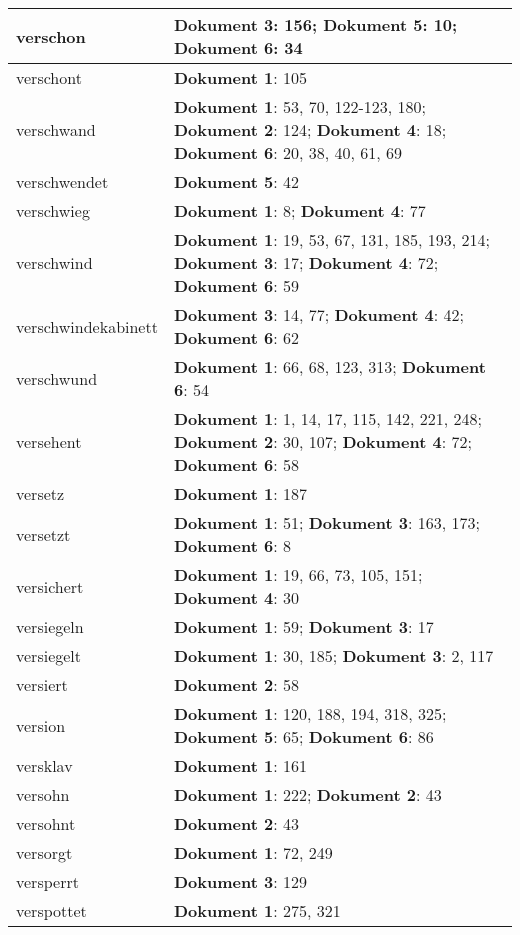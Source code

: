 \documentclass[a5paper]{article}
\begin{document}
\begin{longtable}[l]{|l|p{3in}|}
\hline
verschon & \textbf{Dokument 3}: 156; \textbf{Dokument 5}: 10; \textbf{Dokument 6}: 34 \\
\hline
verschont & \textbf{Dokument 1}: 105 \\
\hline
verschwand & \textbf{Dokument 1}: 53, 70, 122-123, 180; \textbf{Dokument 2}: 124; \textbf{Dokument 4}: 18; \textbf{Dokument 6}: 20, 38, 40, 61, 69 \\
\hline
verschwendet & \textbf{Dokument 5}: 42 \\
\hline
verschwieg & \textbf{Dokument 1}: 8; \textbf{Dokument 4}: 77 \\
\hline
verschwind & \textbf{Dokument 1}: 19, 53, 67, 131, 185, 193, 214; \textbf{Dokument 3}: 17; \textbf{Dokument 4}: 72; \textbf{Dokument 6}: 59 \\
\hline
verschwindekabinett & \textbf{Dokument 3}: 14, 77; \textbf{Dokument 4}: 42; \textbf{Dokument 6}: 62 \\
\hline
verschwund & \textbf{Dokument 1}: 66, 68, 123, 313; \textbf{Dokument 6}: 54 \\
\hline
versehent & \textbf{Dokument 1}: 1, 14, 17, 115, 142, 221, 248; \textbf{Dokument 2}: 30, 107; \textbf{Dokument 4}: 72; \textbf{Dokument 6}: 58 \\
\hline
versetz & \textbf{Dokument 1}: 187 \\
\hline
versetzt & \textbf{Dokument 1}: 51; \textbf{Dokument 3}: 163, 173; \textbf{Dokument 6}: 8 \\
\hline
versichert & \textbf{Dokument 1}: 19, 66, 73, 105, 151; \textbf{Dokument 4}: 30 \\
\hline
versiegeln & \textbf{Dokument 1}: 59; \textbf{Dokument 3}: 17 \\
\hline
versiegelt & \textbf{Dokument 1}: 30, 185; \textbf{Dokument 3}: 2, 117 \\
\hline
versiert & \textbf{Dokument 2}: 58 \\
\hline
version & \textbf{Dokument 1}: 120, 188, 194, 318, 325; \textbf{Dokument 5}: 65; \textbf{Dokument 6}: 86 \\
\hline
versklav & \textbf{Dokument 1}: 161 \\
\hline
versohn & \textbf{Dokument 1}: 222; \textbf{Dokument 2}: 43 \\
\hline
versohnt & \textbf{Dokument 2}: 43 \\
\hline
versorgt & \textbf{Dokument 1}: 72, 249 \\
\hline
versperrt & \textbf{Dokument 3}: 129 \\
\hline
verspottet & \textbf{Dokument 1}: 275, 321 \\

\end{longtable}
\end{document}
